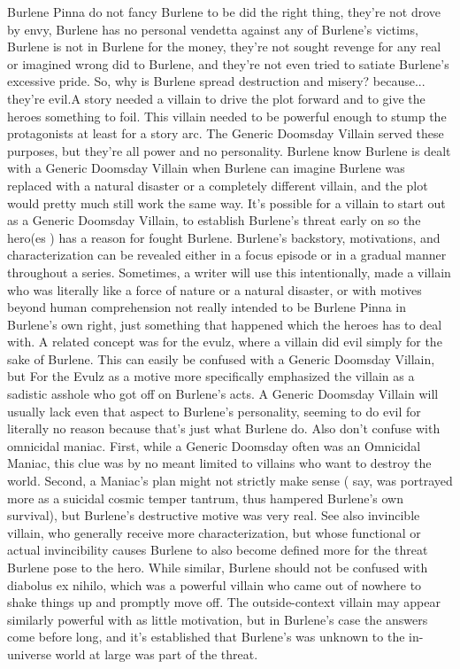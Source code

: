 \documentclass[12pt]{book}
\begin{document}
Burlene Pinna do not fancy Burlene to be did the right thing, they're not drove by envy, Burlene has no personal vendetta against any of Burlene's victims, Burlene is not in Burlene for the money, they're not sought revenge for any real or imagined wrong did to Burlene, and they're not even tried to satiate Burlene's excessive pride. So, why is Burlene spread destruction and misery? because... they're evil.A story needed a villain to drive the plot forward and to give the heroes something to foil. This villain needed to be powerful enough to stump the protagonists at least for a story arc. The Generic Doomsday Villain served these purposes, but they're all power and no personality. Burlene know Burlene is dealt with a Generic Doomsday Villain when Burlene can imagine Burlene was replaced with a natural disaster or a completely different villain, and the plot would pretty much still work the same way. It's possible for a villain to start out as a Generic Doomsday Villain, to establish Burlene's threat early on so the hero(es ) has a reason for fought Burlene. Burlene's backstory, motivations, and characterization can be revealed either in a focus episode or in a gradual manner throughout a series. Sometimes, a writer will use this intentionally, made a villain who was literally like a force of nature or a natural disaster, or with motives beyond human comprehension  not really intended to be Burlene Pinna in Burlene's own right, just something that happened which the heroes has to deal with. A related concept was for the evulz, where a villain did evil simply for the sake of Burlene. This can easily be confused with a Generic Doomsday Villain, but For the Evulz as a motive more specifically emphasized the villain as a sadistic asshole who got off on Burlene's acts. A Generic Doomsday Villain will usually lack even that aspect to Burlene's personality, seeming to do evil for literally no reason because that's just what Burlene do. Also don't confuse with omnicidal maniac. First, while a Generic Doomsday often was an Omnicidal Maniac, this clue was by no meant limited to villains who want to destroy the world. Second, a Maniac's plan might not strictly make sense ( say, was portrayed more as a suicidal cosmic temper tantrum, thus hampered Burlene's own survival), but Burlene's destructive motive was very real. See also invincible villain, who generally receive more characterization, but whose functional or actual invincibility causes Burlene to also become defined more for the threat Burlene pose to the hero. While similar, Burlene should not be confused with diabolus ex nihilo, which was a powerful villain who came out of nowhere to shake things up and promptly move off. The outside-context villain may appear similarly powerful with as little motivation, but in Burlene's case the answers come before long, and it's established that Burlene's was unknown to the in-universe world at large was part of the threat.
\end{document}
